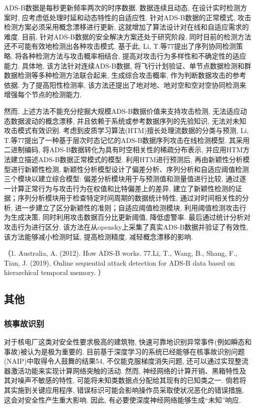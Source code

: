 \documentclass{Style/aas}
\begin{document}
\begin{multicols}{2}
  ADS-B数据是每秒更新频率两次的时序数据. 数据连续且动态, 在设计实时检测方案时, 应考虑低处理时延和动态特性的自适应性. 针对ADS-B数据的正常模式, 攻击检测方案必须采用概念漂移进行更新, 这就增加了算法设计对在线和自适应需求的难度. 目前, 针对ADS-B数据的安全解决方案还处于研究阶段, 同时目前的检测方法还不可能有效地检测出各种攻击模式. 基于此, Li, T.等77提出了序列协同检测策略, 将各种检测方法与攻击概率相结合, 提高对攻击行为多样性和不确定性的适应能力. 具体地, 该方法针对连续ADS-B数据, 将飞行计划验证、单节点数据检测和群数据检测等多种检测方法联合起来, 生成综合攻击概率, 作为判断数据攻击的参考依据. 为了提高阳性检测率, 该方法还提出了地对地、地对空和空对空协同检测来增强每个节点的检测能力.

  然而, 上述方法不能充分挖掘大规模ADS-B数据价值来支持攻击检测, 无法适应动态数据波动的概念漂移, 并且依赖于系统或参考数据序列的先验知识, 无法对未知攻击模式有效识别. 考虑到皮质学习算法(HTM)擅长处理流数据的分类与预测, Li, T.等77提出了一种基于层次时态记忆的ADS-B数据序列攻击在线检测模型. 其采用二进制编码, 将ADS-B数据转化为具有时空相关性的稀疏分布表示, 并应用HTM方法建立描述ADS-B数据正常模式的模型. 利用HTM进行预测后, 再由新颖性分析模型进行新颖性检测, 新颖性分析模型设计了偏差分析、序列分析和自适应阈值检测三个模块以建立综合模型: 偏差分析模块用于与预测值和测量值进行比较, 通过逐一计算正常行为与攻击行为在权值和比特偏差上的差异, 建立了新颖性检测的证据；序列分析模块用于检查特定时间周期的数据统计特性, 通过对时间相关性的分析, 进一步建立了区分新颖性的准则；自适应阈值检测模块, 利用阈值检测攻击行为生成决策, 同时利用攻击数据百分比更新阈值, 降低虚警率. 最后通过统计分析对攻击行为进行区分. 该方法在从opensky上采集了真实ADS-B数据并验证了有效性, 该方法能够减小检测时延, 提高检测精度, 减轻概念漂移的影响.

  （1.	Australia, A. (2012). How ADS-B works.
  77.Li, T., Wang, B., Shang, F., Tian, J. (2019). Online sequential attack detection for ADS-B data based on hierarchical temporal memory. ）


  \subsection{其他}

  \subsubsection{核事故识别}
  对于核电厂这类对安全性要求极高的建筑物, 快速可靠地识别异常事件(例如瞬态和事故)被认为是极为重要的. 目前基于深度学习的系统已经能够在核事故识别问题(NAIP)中取得令人鼓舞的结果54, 不仅能克服梯度消失问题, 还可以通过实现整流器激活功能来实现计算网络突触的活动. 然而, 神经网络的计算开销、黑箱特性及其对噪声不敏感的特性, 可能将未知类数据点分配给其现有的已知类之一. 倘若将其实施到关键应用程序, 错误标识可能会影响操作员采取使状况恶化的错误措施, 这会对安全性产生重大影响. 因此, 有必要使深度神经网络能够生成“未知”响应.


\end{multicols}
\end{document}
